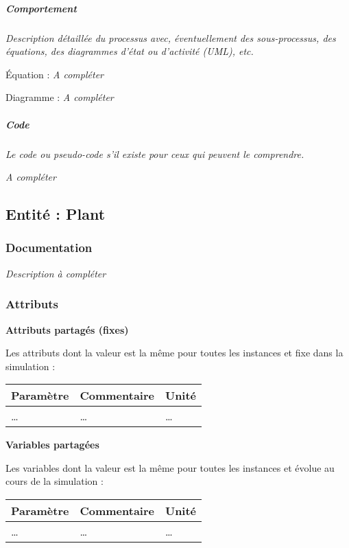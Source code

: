 \documentclass[
]{article}
\begin{document}
\subparagraph{Comportement}\label{comportement-2}

\emph{Description détaillée du processus avec, éventuellement des
sous-processus, des équations, des diagrammes d'état ou d'activité
(UML), etc.}

Équation : \emph{A compléter}

Diagramme : \emph{A compléter}

\subparagraph{Code}\label{code-2}

\emph{Le code ou pseudo-code s'il existe pour ceux qui peuvent le
comprendre.}

\emph{A compléter}

\subsection{Entité : Plant}\label{entituxe9-plant}

\subsubsection{Documentation}\label{documentation-8}

\emph{Description à compléter}

\subsubsection{Attributs}\label{attributs-8}

\textbf{Attributs partagés (fixes)}

Les attributs dont la valeur est la même pour toutes les instances et
fixe dans la simulation :

\begin{longtable}[]{@{}lll@{}}
\toprule\noalign{}
\textbf{Paramètre} & \textbf{Commentaire} & \textbf{Unité} \\
\midrule\noalign{}
\endhead
\bottomrule\noalign{}
\endlastfoot
\ldots{} & \ldots{} & \ldots{} \\
\end{longtable}

\textbf{Variables partagées}

Les variables dont la valeur est la même pour toutes les instances et
évolue au cours de la simulation :

\begin{longtable}[]{@{}lll@{}}
\toprule\noalign{}
\textbf{Paramètre} & \textbf{Commentaire} & \textbf{Unité} \\
\midrule\noalign{}
\endhead
\bottomrule\noalign{}
\endlastfoot
\ldots{} & \ldots{} & \ldots{} \\
\end{longtable}
\end{document}
